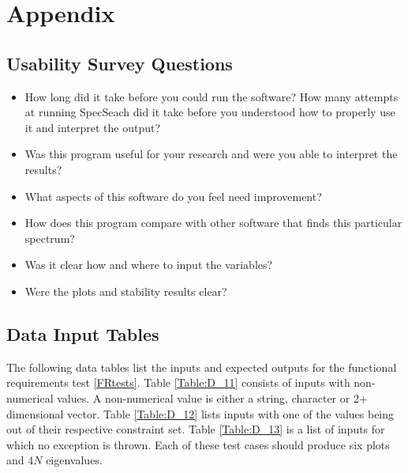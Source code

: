 \documentclass[12pt, titlepage]{article}
\begin{document}
\newpage

\section{Appendix}

\subsection{Usability Survey Questions}
\label{UsabilitySurvey}
\begin{itemize}
	\item How long did it take before you could run the software? How many 
	attempts at running SpecSeach did it take before you understood how to 
	properly use it and interpret the output?
	\item Was this program useful for your research and were you able to 
	interpret the results? 
	\item What aspects of this software do you feel need improvement?
	\item How does this program compare with other software that finds this 
	particular spectrum? 
	\item Was it clear how and where to input the variables? 
	\item Were the plots and stability results clear? 
\end{itemize} 

\newpage
\subsection{Data Input Tables} 
\label{datainput}
The following data tables list the inputs and expected outputs for the 
functional requirements test \ref{FRtests}. Table \ref{Table:D_11} consists of 
inputs with non-numerical values. A non-numerical value is either a string, 
character or 2+ dimensional vector. Table \ref{Table:D_12} lists inputs with 
one of the values being out of their respective constraint set. Table 
\ref{Table:D_13} is a list of inputs for which no exception is thrown. Each of 
these test cases should produce six plots and $4N$ eigenvalues. 
\end{document}
